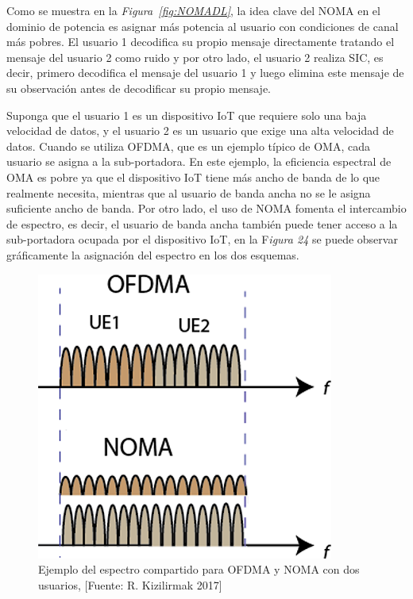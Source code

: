 Como se muestra en la \textit{Figura~\ref{fig:NOMADL}}, la idea clave del NOMA en el dominio de potencia es asignar más potencia al usuario con condiciones de canal más pobres. El usuario 1 decodifica su propio mensaje directamente tratando el mensaje del usuario 2 como ruido y por otro lado, el usuario 2 realiza SIC, es decir, primero decodifica el mensaje del usuario 1 y luego elimina este mensaje de su observación antes de decodificar su propio mensaje.

Suponga que el usuario 1 es un dispositivo IoT que requiere solo una baja velocidad de datos, y el usuario 2 es un usuario que exige una alta velocidad de datos. Cuando se utiliza OFDMA, que es un ejemplo típico de OMA, cada usuario se asigna a la sub-portadora. En este ejemplo, la eficiencia espectral de OMA es pobre ya que el dispositivo IoT tiene más ancho de banda de lo que realmente necesita, mientras que al usuario de banda ancha no se le asigna suficiente ancho de banda. Por otro lado, el uso de NOMA fomenta el intercambio de espectro, es decir, el usuario de banda ancha también puede tener acceso a la sub-portadora ocupada por el dispositivo IoT, en la F\textit{igura 24} se puede observar gráficamente la asignación del espectro en los dos esquemas.

\begin{figure}[th]
\centering
\includegraphics[scale=1]{Figures/Ejemplo del espectro compartido para OFDMA y NOMA con dos usuarios}
\decoRule
\caption[Ejemplo del espectro compartido para OFDMA y NOMA con dos usuarios.]{Ejemplo del espectro compartido para OFDMA y NOMA con dos usuarios, [Fuente: R. Kizilirmak 2017]}
\label{fig:OFDMANOMA}
\end{figure}

